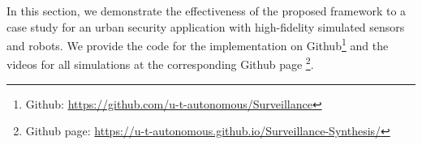 In this section, we demonstrate the effectiveness of the proposed framework to a case study for an urban security application with high-fidelity simulated sensors and robots. 
We provide the code for the implementation on Github\footnote{Github: \url{https://github.com/u-t-autonomous/Surveillance}} and the videos for all simulations at the corresponding Github page \footnote{Github page: \url{https://u-t-autonomous.github.io/Surveillance-Synthesis/}}.



